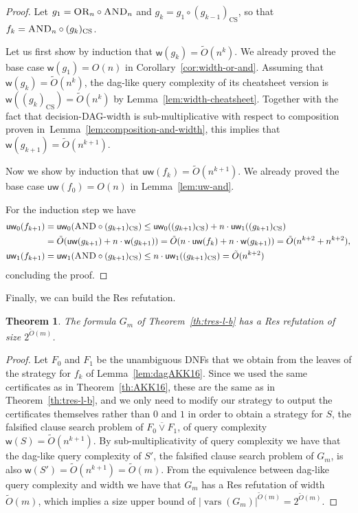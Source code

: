 \documentclass[11pt]{article}
\newcommand{\scterm}[1]{{\textrm{\sc #1}}}
\newcommand{\res}{\scterm{Res}}
\newcommand{\AND}{{\scterm{AND}}}
\newcommand{\OR}{{\scterm{OR}}}
\newcommand{\dagw}{\mathsf{w}}
\newcommand{\uw}{\mathsf{uw}}
\DeclareMathOperator{\vars}{vars}
\newcommand{\olnot}[1]{\overline{#1}}
\numberwithin{equation}{section}
\newtheorem{theorem}{Theorem}[section]
\begin{document}
\begin{proof}
  Let $g_1 = \OR_n \circ \AND_n$ and $g_k = g_1 \circ (g_{k-1})_\mathrm{CS}$, so that $f_k = \AND_n \circ (g_k)_\mathrm{CS}$.

  Let us first show by induction that $\dagw(g_k)=\tilde O(n^k)$. We already proved the base case $\dagw(g_1)=O(n)$ in Corollary~\ref{cor:width-or-and}.
  Assuming that $\dagw(g_{k})=\tilde O(n^{k})$, the dag-like query complexity of its cheatsheet version is $\dagw((g_{k})_{\mathrm{CS}})=\tilde O(n^{k})$ by Lemma~\ref{lem:width-cheatsheet}.
  Together with the fact that decision-DAG-width is sub-multiplicative with respect to composition proven in~Lemma~\ref{lem:composition-and-width}, this implies that $\dagw(g_{k+1})=\tilde O(n^{k+1})$.

  Now we show by induction that $\uw(f_k)=\tilde O(n^{k+1})$. We already proved the base case $\uw(f_0)=O(n)$ in Lemma~\ref{lem:uw-and}.

For the induction step we have
\begin{align*}
  \uw_0(f_{k+1}) &= \uw_0(\AND \circ (g_{k+1})_\mathrm{CS})
                   \leq \uw_0((g_{k+1})_\mathrm{CS}) + n\cdot \uw_1((g_{k+1})_\mathrm{CS}) \\
  &= \tilde O(\uw(g_{k+1}) + n\cdot \dagw(g_{k+1})) = \tilde O(n\cdot \uw(f_k)+n\cdot \dagw(g_{k+1})) = \tilde O(n^{k+2}+n^{k+2}), \\
  \uw_1(f_{k+1}) &= \uw_1(\AND \circ (g_{k+1})_\mathrm{CS})
                   \leq n\cdot\uw_1((g_{k+1})_\mathrm{CS}) = \tilde O(n^{k+2})
\end{align*}
concluding the proof.
\end{proof}

Finally, we can build the {\res} refutation.

\begin{theorem}\label{th:res-u-b}
The formula $G_m$ of Theorem~\ref{th:tres-l-b} has a {\res} refutation of size $2^{\tilde O(m)}$.
\end{theorem}

\begin{proof}

Let $F_0$ and $F_1$ be the unambiguous DNFs that we obtain from the leaves of the strategy for $f_k$ of Lemma~\ref{lem:dagAKK16}. Since we used the same certificates as in Theorem~\ref{th:AKK16}, these are the same as in Theorem~\ref{th:tres-l-b}, and we only need to modify our strategy to output the certificates themselves rather than $0$ and $1$ in order to obtain a strategy for $S$, the falsified clause search problem of $\olnot{F_0 \lor F_1}$, of query complexity $\dagw(S)=\tilde O(n^{k+1})$. By sub-multiplicativity of query complexity we have that the dag-like query complexity of $S'$, the falsified clause search problem of $G_m$, is also $\dagw(S')=\tilde O(n^{k+1})=\tilde O(m)$. From the equivalence between dag-like query complexity and width we have that $G_m$ has a {\res} refutation of width $\tilde O(m)$, which implies a size upper bound of $\lvert\vars(G_m)\rvert^{\tilde O(m)}=2^{\tilde O(m)}$.
\end{proof}
\end{document}
